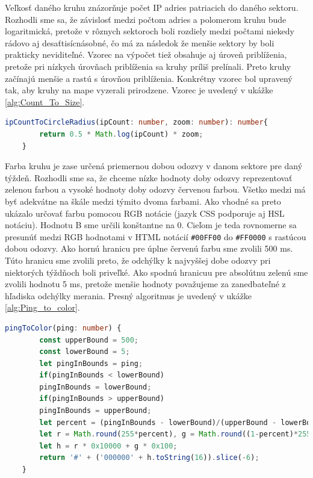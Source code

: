 Veľkosť daného kruhu znázorňuje počet IP adries patriacich do daného sektoru. Rozhodli sme sa, že závislosť medzi počtom adries a polomerom kruhu bude 
logaritmická, pretože v rôznych sektoroch boli rozdiely medzi počtami niekedy rádovo aj desaťtisícnásobné, čo má za následok že menšie sektory by boli prakticky 
neviditeľné. Vzorec na výpočet tiež obsahuje aj úroveň priblíženia, pretože pri nízkych úrovňach priblíženia sa kruhy príliš prelínali. Preto kruhy začínajú 
menšie a rastú s úrovňou priblíženia. Konkrétny vzorec bol upravený tak, aby kruhy na mape vyzerali prirodzene. Vzorec je uvedený v 
ukážke \ref{alg:Count_To_Size}.

\begin{lstlisting}[language={TypeScript},caption={Ukážka kódu na výpočet veľkosti kruhu z počtu IP adries v sektore},label=alg:Count_To_Size]
    ipCountToCircleRadius(ipCount: number, zoom: number): number{
        return 0.5 * Math.log(ipCount) * zoom;
    }
\end{lstlisting}

Farba kruhu je zase určená priemernou dobou odozvy v danom sektore pre daný týždeň. Rozhodli sme sa, že chceme nízke hodnoty doby odozvy reprezentovať 
zelenou farbou a vysoké hodnoty doby odozvy červenou farbou. Všetko medzi má byť adekvátne na škále medzi týmito dvoma farbami. Ako vhodné sa preto ukázalo 
určovať farbu pomocou RGB notácie (jazyk CSS podporuje aj HSL notáciu). Hodnotu B sme určili konštantne na 0. Cieľom je teda rovnomerne sa presunúť medzi 
RGB hodnotami v HTML notácií \lstinline{#00FF00} do \lstinline{#FF0000} s rastúcou dobou odozvy. Ako hornú hranicu pre úplne červenú farbu sme zvolili 500 ms. 
Túto hranicu sme zvolili preto, že odchýlky k najvyššej dobe odozvy pri niektorých týždňoch boli priveľké. Ako spodnú hranicuu pre absolútnu zelenú sme zvolili 
hodnotu 5 ms, pretože menšie hodnoty považujeme za zanedbateľné z hľadiska odchýlky merania. Presný algoritmus je uvedený v ukážke \ref{alg:Ping_to_color}.

\begin{lstlisting}[language={TypeScript},caption={Ukážka kódu na výpočet veľkosti kruhu z počtu IP adries v sektore},label=alg:Ping_to_color]
    pingToColor(ping: number) {
        const upperBound = 500;
        const lowerBound = 5;
        let pingInBounds = ping;
        if(pingInBounds < lowerBound)
        pingInBounds = lowerBound;
        if(pingInBounds > upperBound)
        pingInBounds = upperBound;
        let percent = (pingInBounds - lowerBound)/(upperBound - lowerBound);
        let r = Math.round(255*percent), g = Math.round((1-percent)*255), b = 0;
        let h = r * 0x10000 + g * 0x100;
        return '#' + ('000000' + h.toString(16)).slice(-6);
    }
\end{lstlisting}

